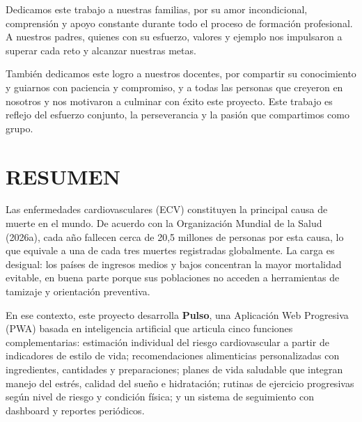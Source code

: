 \documentclass[12pt,letterpaper]{article}
\begin{document}
Dedicamos este trabajo a nuestras familias, por su amor incondicional, comprensión
y apoyo constante durante todo el proceso de formación profesional. A nuestros
padres, quienes con su esfuerzo, valores y ejemplo nos impulsaron a superar cada
reto y alcanzar nuestras metas.

También dedicamos este logro a nuestros docentes, por compartir su conocimiento y
guiarnos con paciencia y compromiso, y a todas las personas que creyeron en
nosotros y nos motivaron a culminar con éxito este proyecto. Este trabajo es
reflejo del esfuerzo conjunto, la perseverancia y la pasión que compartimos como
grupo.

\newpage

\renewcommand{\contentsname}{ÍNDICE}
\tableofcontents

\newpage

\section*{RESUMEN}

Las enfermedades cardiovasculares (ECV) constituyen la principal causa de muerte
en el mundo. De acuerdo con la Organización Mundial de la Salud (2026a), cada año
fallecen cerca de 20,5 millones de personas por esta causa, lo que equivale a una
de cada tres muertes registradas globalmente. La carga es desigual: los países de
ingresos medios y bajos concentran la mayor mortalidad evitable, en buena parte
porque sus poblaciones no acceden a herramientas de tamizaje y orientación
preventiva.

En ese contexto, este proyecto desarrolla \textbf{Pulso}, una Aplicación Web
Progresiva (PWA) basada en inteligencia artificial que articula cinco funciones
complementarias: estimación individual del riesgo cardiovascular a partir de
indicadores de estilo de vida; recomendaciones alimenticias personalizadas con
ingredientes, cantidades y preparaciones; planes de vida saludable que integran
manejo del estrés, calidad del sueño e hidratación; rutinas de ejercicio
progresivas según nivel de riesgo y condición física; y un sistema de seguimiento
con dashboard y reportes periódicos.
\end{document}
